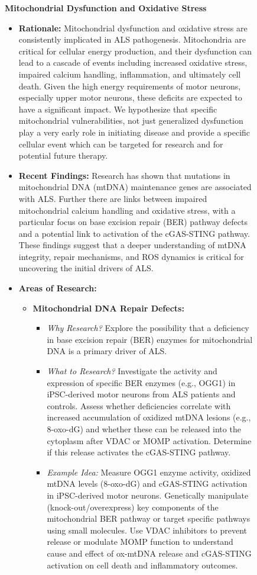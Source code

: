 \begin{figure}[htbp!]
\begin{tcolorbox}
\textbf{Mitochondrial Dysfunction and Oxidative Stress}
\begin{itemize}
    \item \textbf{Rationale:} Mitochondrial dysfunction and oxidative stress are consistently implicated in ALS pathogenesis. Mitochondria are critical for cellular energy production, and their dysfunction can lead to a cascade of events including increased oxidative stress, impaired calcium handling, inflammation, and ultimately cell death. Given the high energy requirements of motor neurons, especially upper motor neurons, these deficits are expected to have a significant impact. We hypothesize that specific mitochondrial vulnerabilities, not just generalized dysfunction play a very early role in initiating disease and provide a specific cellular event which can be targeted for research and for potential future therapy.
    \item \textbf{Recent Findings:} Research has shown that mutations in mitochondrial DNA (mtDNA) maintenance genes are associated with ALS. Further there are links between impaired mitochondrial calcium handling and oxidative stress, with a particular focus on base excision repair (BER) pathway defects and a potential link to activation of the cGAS-STING pathway. These findings suggest that a deeper understanding of mtDNA integrity, repair mechanisms, and ROS dynamics is critical for uncovering the initial drivers of ALS.
    \item \textbf{Areas of Research:}
    \begin{itemize}
        \item \textbf{Mitochondrial DNA Repair Defects:}
        \begin{itemize}
            \item \textit{Why Research?} Explore the possibility that a deficiency in base excision repair (BER) enzymes for mitochondrial DNA is a primary driver of ALS.
            \item \textit{What to Research?} Investigate the activity and expression of specific BER enzymes (e.g., OGG1) in iPSC-derived motor neurons from ALS patients and controls. Assess whether deficiencies correlate with increased accumulation of oxidized mtDNA lesions (e.g., 8-oxo-dG) and whether these can be released into the cytoplasm after VDAC or MOMP activation. Determine if this release activates the cGAS-STING pathway.
            \item \textit{Example Idea:} Measure OGG1 enzyme activity, oxidized mtDNA levels (8-oxo-dG) and cGAS-STING activation in iPSC-derived motor neurons. Genetically manipulate (knock-out/overexpress) key components of the mitochondrial BER pathway or target specific pathways using small molecules. Use VDAC inhibitors to prevent release or modulate MOMP function to understand cause and effect of ox-mtDNA release and cGAS-STING activation on cell death and inflammatory outcomes.

\end{itemize}
\end{itemize}
\end{itemize}
\end{tcolorbox}
\end{figure}

